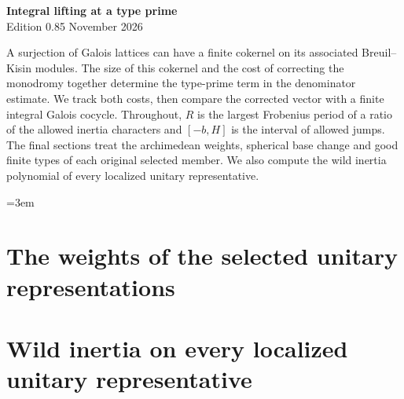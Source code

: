 \begin{center}
{\Large\bfseries Integral lifting at a type prime}\\[4pt]
Edition 0.85  November 2026
\end{center}

A surjection of Galois lattices can have a finite cokernel on
its associated Breuil--Kisin modules. The size of this cokernel and
the cost of correcting the monodromy together determine the type-prime
term in the denominator estimate. We track both costs, then compare
the corrected vector with a finite integral Galois cocycle. Throughout,
$R$ is the largest Frobenius period of a ratio of the allowed inertia
characters and $[-b,H]$ is the interval of allowed jumps. The final
sections treat the archimedean weights, spherical base change and good
finite types of each original selected member. We also compute the wild
inertia polynomial of every localized unitary representative.

\begingroup\emergencystretch=3em






\section{The weights of the selected unitary representations}



\section{Wild inertia on every localized unitary representative}

\endgroup
